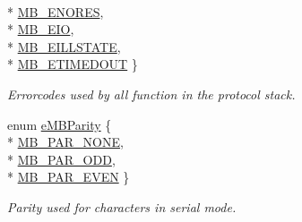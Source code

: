 \begin{DoxyCompactItemize}
\\*
\hyperlink{group__modbus_gga9e7fce8c431cb0e521c67f7f36dd823daf0700c1e37bfc75068e6577bc0b04bb8}{M\+B\+\_\+\+E\+N\+O\+R\+ES}, 
\\*
\hyperlink{group__modbus_gga9e7fce8c431cb0e521c67f7f36dd823daf6eed4a1c490af14b7467be1e6e2fe67}{M\+B\+\_\+\+E\+IO}, 
\\*
\hyperlink{group__modbus_gga9e7fce8c431cb0e521c67f7f36dd823daf0e64a209ac1a01935167c6986338a6f}{M\+B\+\_\+\+E\+I\+L\+L\+S\+T\+A\+TE}, 
\\*
\hyperlink{group__modbus_gga9e7fce8c431cb0e521c67f7f36dd823da017c559e956f718cf77aafe269f49bd5}{M\+B\+\_\+\+E\+T\+I\+M\+E\+D\+O\+UT}
 \}\begin{DoxyCompactList}\small\item\em Errorcodes used by all function in the protocol stack. \end{DoxyCompactList}
\item 
enum \hyperlink{group__modbus_ga16ba85fa56bcd52a11a12576af445ccb}{e\+M\+B\+Parity} \{ \\*
\hyperlink{group__modbus_gga16ba85fa56bcd52a11a12576af445ccba36c1b70b68bc05d618632e3f975a557b}{M\+B\+\_\+\+P\+A\+R\+\_\+\+N\+O\+NE}, 
\\*
\hyperlink{group__modbus_gga16ba85fa56bcd52a11a12576af445ccba955fa6c30334314739ddceed6e749316}{M\+B\+\_\+\+P\+A\+R\+\_\+\+O\+DD}, 
\\*
\hyperlink{group__modbus_gga16ba85fa56bcd52a11a12576af445ccba0415f4c7ede57e13a0cca698a8375dbd}{M\+B\+\_\+\+P\+A\+R\+\_\+\+E\+V\+EN}
 \}\begin{DoxyCompactList}\small\item\em Parity used for characters in serial mode. \end{DoxyCompactList}
\end{DoxyCompactItemize}

